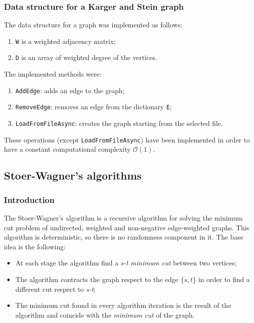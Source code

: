 \subsubsection{Data structure for a Karger and Stein graph}
The data structure for a graph was implemented as follows:
\begin{enumerate}
    \item \verb|W| is a weighted adjacency matrix;
    \item \verb|D| is an array of weighted degree of the vertices.
\end{enumerate}
\noindent
The implemented methods were:
\begin{enumerate}
    \item \verb|AddEdge|: adds an edge to the graph;
    \item \verb|RemoveEdge|: removes an edge from the dictionary \verb|E|;
    \item \verb|LoadFromFileAsync|: creates the graph starting from the selected file.
\end{enumerate}
These operations (except \verb|LoadFromFileAsync|) have been implemented in order to have a constant computational complexity $\mathcal{O}(1)$.

\subsection{Stoer-Wagner's algorithms}

\subsubsection{Introduction}
The Stoer-Wagner's algorithm is a recursive algorithm for solving the minimum cut problem of undirected, weighted and non-negative edge-weighted graphs. This algorithm is deterministic, so there is no randomness component in it.
The base idea is the following:
\begin{itemize}
    \item At each stage the algorithm find a \textit{s-t minimum cut} between two vertices;
    \item The algorithm contracts the graph respect to the edge $\{s,t\}$ in order to find a different cut respect to \textit{s-t};
    \item The minimum cut found in every algorithm iteration is the result of the algorithm and coincide with the \textit{minimum cut} of the graph.
\end{itemize}

